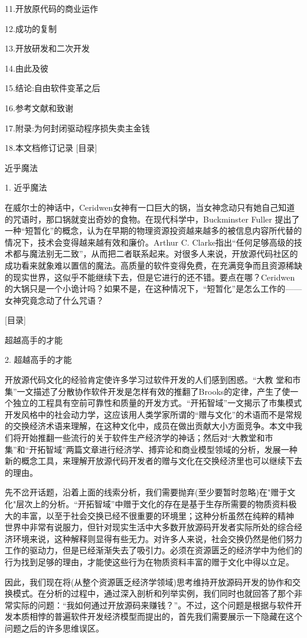 \documentclass[a4paper,12pt,UTF8,twoside]{ctexbook}
\begin{document}
11.开放原代码的商业运作

12.成功的复制

13.开放研发和二次开发

14.由此及彼

15.结论:自由软件变革之后

16.参考文献和致谢

17.附录:为何封闭驱动程序损失卖主金钱

18.本文档修订记录
[目录]

近乎魔法

1. 近乎魔法

在威尔士的神话中，Ceridwen女神有一口巨大的锅，当女神念动只有她自己知道的咒语时，那口锅就变出奇妙的食物。在现代科学中，Buckminster Fuller 提出了一种“短暂化”的概念，认为在早期的物理资源投资越来越多的被信息内容所代替的情况下，技术会变得越来越有效和廉价。Arthur C. Clarke指出“任何足够高级的技术都与魔法别无二致”，从而把二者联系起来。对很多人来说，开放源代码社区的成功看来就象难以置信的魔法。高质量的软件变得免费，在充满竞争而且资源稀缺的现实世界，这似乎不能继续下去，但是它进行的还不错。要点在哪？Ceridwen的大锅只是一个小诡计吗？如果不是，在这种情况下，“短暂化”是怎么工作的——女神究竟念动了什么咒语？


[目录]

超越高手的才能

2. 超越高手的才能

开放源代码文化的经验肯定使许多学习过软件开发的人们感到困惑。“大教 堂和市集”一文描述了分散协作软件开发是怎样有效的推翻了Brooks的定律，产生了使一个独立的工程具有空前可靠性和质量的开发方式。“开拓智域”一文揭示了市集模式开发风格中的社会动力学，这应该用人类学家所谓的“赠与文化”的术语而不是常规的交换经济术语来理解，在这种文化中，成员在做出贡献大小方面竞争。本文中我们将开始推翻一些流行的关于软件生产经济学的神话；然后对“大教堂和市集”和“开拓智域”两篇文章进行经济学、搏弈论和商业模型领域的分析，发展一种新的概念工具，来理解开放源代码开发者的赠与文化在交换经济里也可以继续下去的理由。


先不岔开话题，沿着上面的线索分析，我们需要抛弃(至少要暂时忽略)在"赠于文化"层次上的分析。“开拓智域”中赠于文化的存在是基于生存所需要的物质资料极大的丰富，以至于社会交换已经不很重要的环境里；这种分析虽然在纯粹的精神 世界中非常有说服力，但针对现实生活中大多数开放源码开发者实际所处的综合经济环境来说，这种解释则显得有些无力。对许多人来说，社会交换仍然是他们努力工作的驱动力，但是已经渐渐失去了吸引力。必须在资源匮乏的经济学中为他们的行为找到足够的理由，才能使这些行为在物质资料丰富的赠于文化中得以立足。


因此，我们现在将(从整个资源匮乏经济学领域)思考维持开放源码开发的协作和交换模式。在分析的过程中，通过深入剖析和列举实例，我们同时也就回答了那个非常实际的问题：“我如何通过开放源码来赚钱？”。不过，这个问题是根据与软件开发本质相悖的普遍软件开发经济模型而提出的，首先我们需要展示一下隐藏在这个问题之后的许多思维误区。
\end{document}
